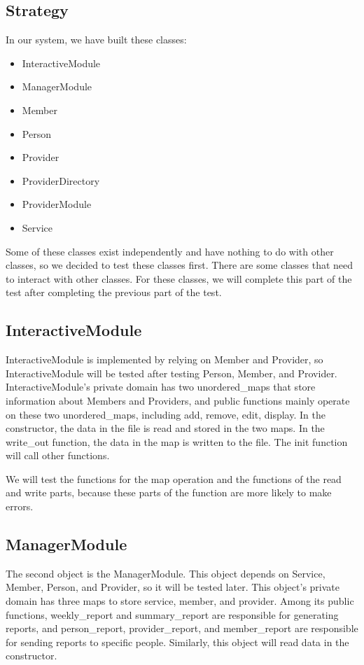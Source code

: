\documentclass{article}
\begin{document}
\subsection{Strategy}
In our system, we have built these classes:

\begin{itemize}
   \item InteractiveModule
   \item ManagerModule
   \item Member
   \item Person
   \item Provider
   \item ProviderDirectory
   \item ProviderModule
   \item Service
\end{itemize}

Some of these classes exist independently and have nothing to do with
other classes, so we decided to test these classes first. There are some
classes that need to interact with other classes. For these classes, we will
complete this part of the test after completing the previous part of the test.

\subsection{InteractiveModule}
InteractiveModule is implemented by relying on Member and Provider, so
InteractiveModule will be tested after testing Person, Member, and
Provider. InteractiveModule's private domain has two unordered_maps
that store information about Members and Providers, and public functions
mainly operate on these two unordered_maps, including add, remove,
edit, display. In the constructor, the data in the file is read and stored in
the two maps. In the write_out function, the data in the map is written to
the file. The init function will call other functions.

We will test the functions for the map operation and the functions of the
read and write parts, because these parts of the function are more likely to
make errors.

\subsection{ManagerModule}

The second object is the ManagerModule. This object depends on
Service, Member, Person, and Provider, so it will be tested later. This
object's private domain has three maps to store service, member, and
provider. Among its public functions, weekly_report and summary_report
are responsible for generating reports, and person_report,
provider_report, and member_report are responsible for sending reports to
specific people. Similarly, this object will read data in the constructor.
\end{document}
